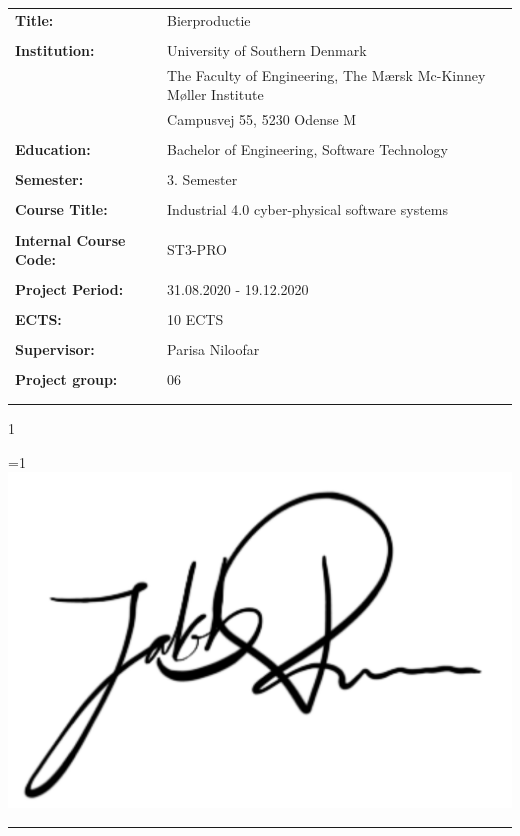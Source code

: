 \begin{tabular}{@{}l l} 
\textbf{Title:} & Bierproductie \\
& \\
\textbf{Institution:} & University of Southern Denmark \\
& The Faculty of Engineering, The Mærsk Mc-Kinney Møller Institute \\
& Campusvej 55, 5230 Odense M \\
& \\
\textbf{Education:} & Bachelor of Engineering, Software Technology\\
& \\
\textbf{Semester:} & 3. Semester \\
& \\
\textbf{Course Title:} & Industrial 4.0 cyber-physical software systems \\
& \\
\textbf{Internal Course Code:} & ST3-PRO \\
& \\
\textbf{Project Period:} &  31.08.2020 - 19.12.2020\\
& \\
\textbf{ECTS:} & 10 ECTS\\
& \\
\textbf{Supervisor:} & Parisa Niloofar\\
& \\
\textbf{Project group:} & 06\\
& \\

\\
\end{tabular}

\setcounter{PROD} {1}



\ifnum \value{PROD}=1
    \includegraphics[scale=0.07]{images/signatures/signatureJR.jpg}
    \vspace{-9.5mm}
\fi
\par\rule{\textwidth}{0.4pt}

